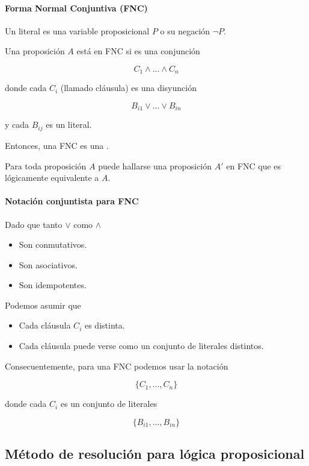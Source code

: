 \paragraph{Forma Normal Conjuntiva (FNC)}

Un literal es una variable proposicional $P$ o su negación $\lnot P$.

Una proposición $A$ está en FNC si es una conjunción

\[C_1 \land \dots \land C_n\]

donde cada $C_i$ (llamado cláusula) es una disyunción

\[B_{i1} \lor \dots \lor B_{in}\]

y cada $B_{ij}$ es un literal.

Entonces, una FNC es una .

\begin{teo}
  Para toda proposición $A$ puede hallarse una proposición $A'$ en FNC que es lógicamente equivalente a $A$.
\end{teo}

\paragraph{Notación conjuntista para FNC}

Dado que tanto $\lor$ como $\land$
\begin{itemize}
  \item Son conmutativos.
  \item Son asociativos.
  \item Son idempotentes.
\end{itemize}

Podemos asumir que
\begin{itemize}
  \item Cada cláusula $C_i$ es distinta.
  \item Cada cláusula puede verse como un conjunto de literales distintos.
\end{itemize}

Consecuentemente, para una FNC podemos usar la notación

\[\{C_1, \dots, C_n\}\]

donde cada $C_i$ es un conjunto de literales

\[\{B_{i1}, \dots, B_{in}\}\]

\subsection{Método de resolución para lógica proposicional}

